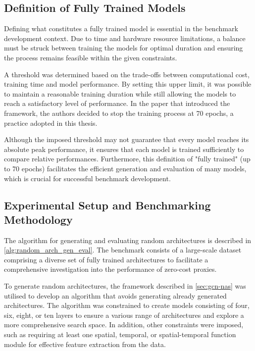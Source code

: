 \subsection{Definition of Fully Trained Models}\label{sec:full_trained}

Defining what constitutes a fully trained model is essential in the benchmark development context. Due to time and hardware resource limitations, a balance must be struck between training the models for optimal duration and ensuring the process remains feasible within the given constraints. 

A threshold was determined based on the trade-offs between computational cost, training time and model performance. By setting this upper limit, it was possible to maintain a reasonable training duration while still allowing the models to reach a  satisfactory level of performance. In the paper that introduced the framework, the authors \autocite{peng2020learning} decided to stop the training process at 70 epochs, a practice adopted in this thesis.

Although the imposed threshold may not guarantee that every model reaches its absolute peak performance, it ensures that each model is trained sufficiently to compare relative performances. Furthermore, this definition of "fully trained" (up to 70 epochs) facilitates the efficient generation and evaluation of many models, which is crucial for successful benchmark development.




\subsection{Experimental Setup and Benchmarking Methodology}\label{subsec:experimentalsetup}

The algorithm for generating and evaluating random architectures is described in \cref{alg:random_arch_gen_eval}. The benchmark consists of a large-scale dataset comprising a diverse set of fully trained architectures to facilitate a comprehensive investigation into the performance of zero-cost proxies.

To generate random architectures, the framework described in \cref{sec:gcn-nas} was utilised to develop an algorithm that avoids generating already generated architectures. The algorithm was constrained to create models consisting of four, six, eight, or ten layers to ensure a various range of architectures and explore a more comprehensive search space. In addition, other constraints were imposed, such as requiring at least one spatial, temporal, or spatial-temporal function module for effective feature extraction from the data.


